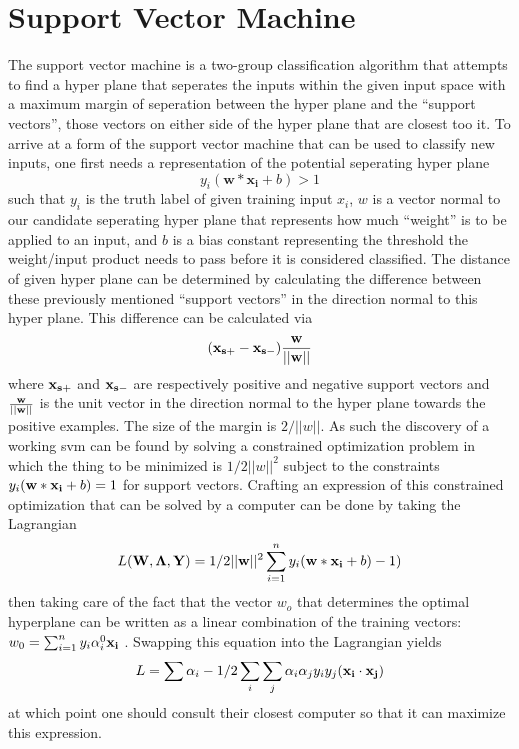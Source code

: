 \section{Support Vector Machine}
The support vector machine is a two-group classification algorithm that attempts to find a hyper
plane that seperates the inputs within the given input space with a maximum margin of seperation
between the hyper plane and the ``support vectors'', those vectors on either side of the hyper plane
that are closest too it. To arrive at a form of the support vector machine that can be used to classify
new inputs, one first needs a representation of the potential seperating hyper plane $$y_i(\mathbf{w}*\mathbf{x_i} + b) > 1$$ such that $y_i$ is the truth label of given training input $x_i$, $w$ is a vector normal to our
candidate seperating hyper plane that represents how much ``weight'' is to be applied to an input, and $b$ is a bias constant representing the threshold the weight/input product needs to pass before it is considered
classified. The distance of given hyper plane can be determined by calculating the difference between
these previously mentioned ``support vectors'' in the direction normal to this hyper plane. This difference
can be calculated via $$(\bold{x_{s+}}-\bold{x_{s-}})\bold{\frac{w}{||w||}}$$ where $\bold{x_{s+}}$ and
$\bold{x_{s-}}$ are respectively positive and negative support vectors and $\bold{\frac{w}{||w||}}$ is
the unit vector in the direction normal to the hyper plane towards the positive examples. The size
of the margin is $2/||w||$. As such the discovery of a working svm can be found by solving a
constrained optimization problem in which the thing to be minimized is $1/2||w||^2$ subject to the
constraints $y_i(\bold{w}*\bold{x_i} + b) = 1$ for support vectors. Crafting an expression of this
constrained optimization that can be solved by a computer can be done by taking the Lagrangian
$$L(\bold{W},\bold{\Lambda}, \bold{Y}) = 1/2||\bold{w}||^2 \sum_{i=1}^{n}y_i(\bold{w}*\bold{x_i}+b)-1)$$
then taking care of the fact that the vector $w_o$ that determines the optimal hyperplane can be written
as a linear combination of the training vectors: $w_{0}=\sum_{i=1}^{n}y_{i}\alpha_{i}^{0}\bold{x_i}$ \cite{Vapnik}. Swapping this equation into the Lagrangian yields
$$L = \sum \alpha_{i} - 1/2 \sum_{i}\sum_{j}\alpha_{i}\alpha_{j}y_{i}y_{j}(\bold{x_i}\cdot\bold{x_j})$$
at which point one should consult their closest computer so that it can maximize this expression.

